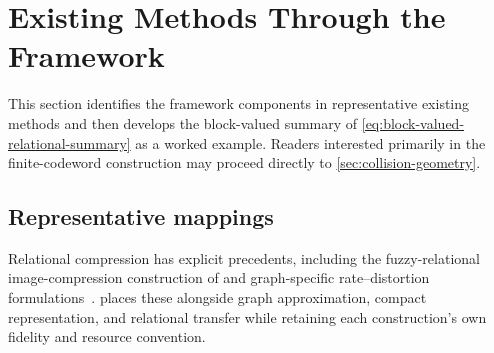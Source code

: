 \section{Existing Methods Through the Framework}
\label{sec:methods-map}

This section identifies the framework components in representative existing methods and then develops the block-valued summary of \cref{eq:block-valued-relational-summary} as a worked example.
Readers interested primarily in the finite-codeword construction may proceed directly to \cref{sec:collision-geometry}.

\subsection{Representative mappings}

Relational compression has explicit precedents, including the fuzzy-relational image-compression construction of \citet{hirota1999fuzzy} and graph-specific rate--distortion formulations~\citep{lynn2021compressibility,wafula2023rate}.
 places these alongside graph approximation, compact representation, and relational transfer while retaining each construction's own fidelity and resource convention.

